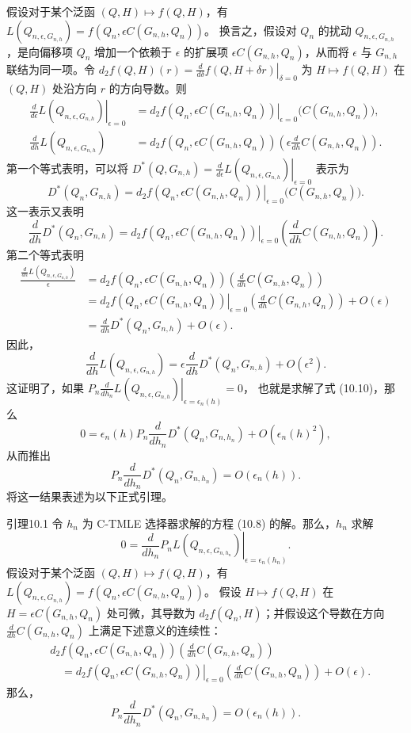 假设对于某个泛函 $(Q,H)\mapsto f(Q,H)$，有
$L(Q_{n,\epsilon,G_{n,h}})
 =f(Q_n,\epsilon C(G_{n,h},Q_n))$。
换言之，假设对 $Q_n$ 的扰动 $Q_{n,\epsilon,G_{n,h}}$，是向偏移项 $Q_n$ 增加一个依赖于 $\epsilon$ 的扩展项 $\epsilon C(G_{n,h},Q_n)$，从而将 $\epsilon$ 与 $G_{n,h}$ 联结为同一项。令
$d_2f(Q,H)(r)
 =\left.\frac{d}{d\delta}f(Q,H+\delta r)\right|_{\delta=0}$
为 $H\mapsto f(Q,H)$ 在 $(Q,H)$ 处沿方向 $r$ 的方向导数。则
\[
 \begin{aligned}
 \left.\frac{d}{d\epsilon}L(Q_{n,\epsilon,G_{n,h}})
       \right|_{\epsilon=0}
 &=\left.d_2f(Q_n,\epsilon C(G_{n,h},Q_n))\right|_{\epsilon=0}
       \bigl(C(G_{n,h},Q_n)\bigr),\\
 \frac{d}{dh}L(Q_{n,\epsilon,G_{n,h}})
 &=d_2f(Q_n,\epsilon C(G_{n,h},Q_n))
       \left(\epsilon\frac{d}{dh}C(G_{n,h},Q_n)\right).
 \end{aligned}
\]
第一个等式表明，可以将
$D^*(Q,G_{n,h})
 =\left.\frac{d}{d\epsilon}L(Q_{n,\epsilon,G_{n,h}})\right|_{\epsilon=0}$
表示为
\[
 D^*(Q_n,G_{n,h})
 =\left.d_2f(Q_n,\epsilon C(G_{n,h},Q_n))\right|_{\epsilon=0}
       \bigl(C(G_{n,h},Q_n)\bigr).
\]
这一表示又表明
\[
 \frac{d}{dh}D^*(Q_n,G_{n,h})
 =\left.d_2f(Q_n,\epsilon C(G_{n,h},Q_n))\right|_{\epsilon=0}
       \left(\frac{d}{dh}C(G_{n,h},Q_n)\right).
\]
第二个等式表明
\[
 \begin{aligned}
 \frac{\frac{d}{dh}L(Q_{n,\epsilon,G_{n,h}})}{\epsilon}
 &=d_2f(Q_n,\epsilon C(G_{n,h},Q_n))
       \left(\frac{d}{dh}C(G_{n,h},Q_n)\right)\\
 &=\left.d_2f(Q_n,\epsilon C(G_{n,h},Q_n))\right|_{\epsilon=0}
       \left(\frac{d}{dh}C(G_{n,h},Q_n)\right)+O(\epsilon)\\
 &=\frac{d}{dh}D^*(Q_n,G_{n,h})+O(\epsilon).
 \end{aligned}
\]
因此，
\[
 \frac{d}{dh}L(Q_{n,\epsilon,G_{n,h}})
 =\epsilon\frac{d}{dh}D^*(Q_n,G_{n,h})+O(\epsilon^2).
\]
这证明了，如果
$\left.P_n\frac{d}{dh_n}L(Q_{n,\epsilon,G_{n,h}})
 \right|_{\epsilon=\epsilon_n(h)}=0$，
也就是求解了式 (10.10)，那么
\[
 0=\epsilon_n(h)P_n\frac{d}{dh_n}D^*(Q_n,G_{n,h_n})
      +O(\epsilon_n(h)^2),
\]
从而推出
\[
 P_n\frac{d}{dh_n}D^*(Q_n,G_{n,h_n})=O(\epsilon_n(h)).
\]
将这一结果表述为以下正式引理。

\begin{bookresult}{引理}{10.1}
令 $h_n$ 为 C-TMLE 选择器求解的方程 (10.8) 的解。那么，$h_n$ 求解
\[
 0=\left.\frac{d}{dh_n}P_nL(Q_{n,\epsilon,G_{n,h_n}})
        \right|_{\epsilon=\epsilon_n(h_n)}.
\]
假设对于某个泛函 $(Q,H)\mapsto f(Q,H)$，有
$L(Q_{n,\epsilon,G_{n,h}})
 =f(Q_n,\epsilon C(G_{n,h},Q_n))$。
假设 $H\mapsto f(Q,H)$ 在 $H=\epsilon C(G_{n,h},Q_n)$ 处可微，其导数为 $d_2f(Q_n,H)$；并假设这个导数在方向
$\frac{d}{dh}C(G_{n,h},Q_n)$
上满足下述意义的连续性：
\[
 \begin{aligned}
 &d_2f(Q_n,\epsilon C(G_{n,h},Q_n))
       \left(\frac{d}{dh}C(G_{n,h},Q_n)\right)\\
 &\quad=\left.d_2f(Q_n,\epsilon C(G_{n,h},Q_n))\right|_{\epsilon=0}
       \left(\frac{d}{dh}C(G_{n,h},Q_n)\right)+O(\epsilon).
 \end{aligned}
\]
那么，
\[
 P_n\frac{d}{dh_n}D^*(Q_n,G_{n,h_n})=O(\epsilon_n(h)).
\]
\end{bookresult}

